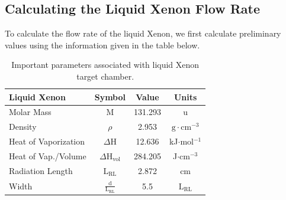 \documentclass[%
reprint,
amsmath, amssymb,
aps,
floatfix,
]{revtex4-2}
\begin{document}
\subsection{Calculating the Liquid Xenon Flow Rate}
To calculate the flow rate of the liquid Xenon, we first calculate preliminary
values using the information given in the table below.

\begin{table}[H]
    \centering
    \begin{tabular}{lccc}
        \hline \hline
        \textbf{Liquid Xenon} & \textbf{Symbol} & \textbf{Value} & \textbf{Units} \\
        \hline
        Molar Mass & M & 131.293 & u \\
        Density & $\rho$ & 2.953 & $\textrm{g} \cdot \textrm{cm}^{-3}$ \\
        Heat of Vaporization & $\Delta \textrm{H}$ & 12.636 & kJ$\cdot$mol$^{-1}$ \\
        Heat of Vap./Volume & $\Delta \textrm{H}_{\textrm{vol}}$ & 284.205 & J$\cdot \textrm{cm}^{-3}$ \\
        Radiation Length & $\textrm{L}_{\textrm{RL}}$ & 2.872 & cm \\
        Width & $\frac{\textrm{d}}{\textrm{L}_{\textrm{RL}}}$ & 5.5 & $\textrm{L}_{\textrm{RL}}$ \\
        \hline \hline
    \end{tabular}
    \caption{\label{tab:XeInfo}Important parameters associated with liquid Xenon target chamber.}
\end{table}
\end{document}
